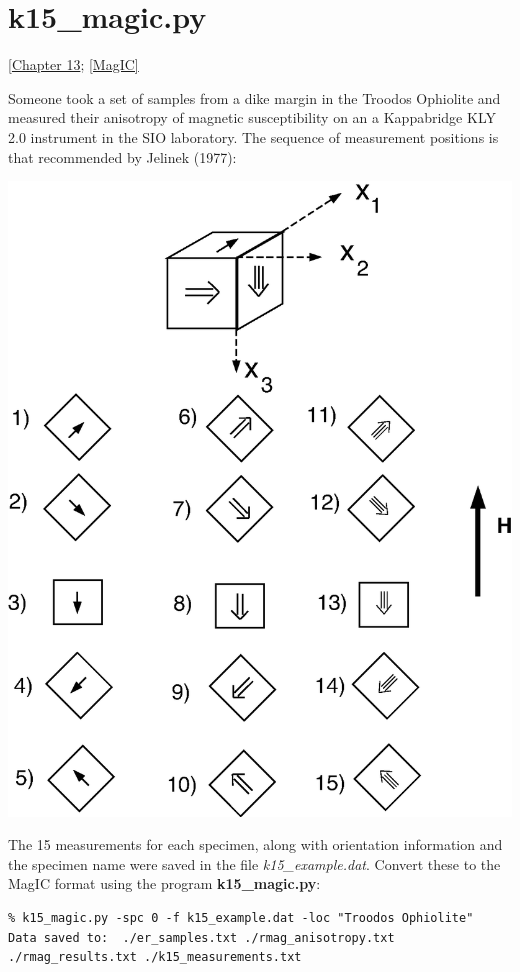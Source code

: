 \documentclass[11pt]{book}
\begin{document}
{{{{%
\section {\bf k15\_magic.py} 
[\href{http://magician.ucsd.edu/Essentials/WebBook2.html#Paleomagnetic_tensors}{Chapter 13}; 
\href{#MagIC}{[MagIC]}


Someone took a set of samples from a dike margin in the Troodos Ophiolite and measured their anisotropy of magnetic susceptibility on an a Kappabridge KLY 2.0 instrument in the SIO laboratory.  The sequence of measurement positions is that recommended by Jelinek (1977):  \nocite{jelinek77}

  \includegraphics[width=15 cm]{EPSfiles/meas15.eps}
  
  
  The 15 measurements for each specimen, along with orientation information and the specimen name were saved in the file {\it k15\_example.dat}.    Convert these to the MagIC format using the program {\bf k15\_magic.py}:

\begin{verbatim}
% k15_magic.py -spc 0 -f k15_example.dat -loc "Troodos Ophiolite"
Data saved to:  ./er_samples.txt ./rmag_anisotropy.txt ./rmag_results.txt ./k15_measurements.txt
 \end{verbatim}

}}}}
\end{document}

